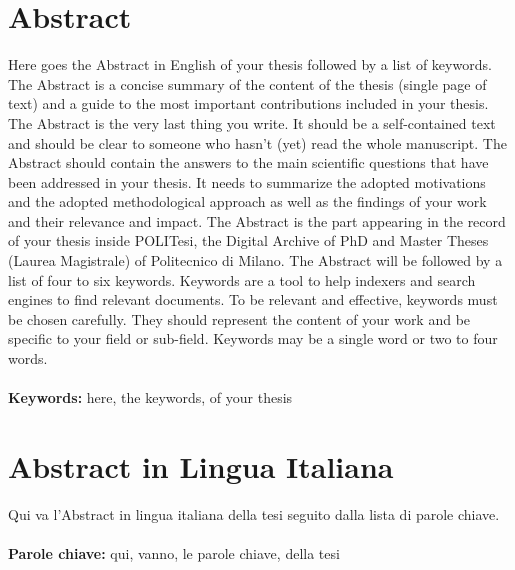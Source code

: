\documentclass{Configuration_Files/PoliMi3i_thesis}
\begin{document}
    \chapter*{Abstract}
    Here goes the Abstract in English of your thesis followed by a list of keywords.
    The Abstract is a concise summary of the content of the thesis (single page of text)
    and a guide to the most important contributions included in your thesis.
    The Abstract is the very last thing you write.
    It should be a self-contained text and should be clear to someone who hasn't (yet) read the whole manuscript.
    The Abstract should contain the answers to the main scientific questions that have been addressed in your thesis.
    It needs to summarize the adopted motivations and the adopted methodological approach as well as the findings of your work and their relevance and impact.
    The Abstract is the part appearing in the record of your thesis inside POLITesi,
    the Digital Archive of PhD and Master Theses (Laurea Magistrale) of Politecnico di Milano.
    The Abstract will be followed by a list of four to six keywords.
    Keywords are a tool to help indexers and search engines to find relevant documents.
    To be relevant and effective, keywords must be chosen carefully.
    They should represent the content of your work and be specific to your field or sub-field.
    Keywords may be a single word or two to four words.
    \\
    \\
    \textbf{Keywords:} here, the keywords, of your thesis %

    \chapter*{Abstract in Lingua Italiana}
    Qui va l'Abstract in lingua italiana della tesi seguito dalla lista di parole chiave.
    \\
    \\
    \textbf{Parole chiave:} qui, vanno, le parole chiave, della tesi %


    \thispagestyle{empty}
    \tableofcontents %
    \thispagestyle{empty}
    \cleardoublepage
\end{document}
